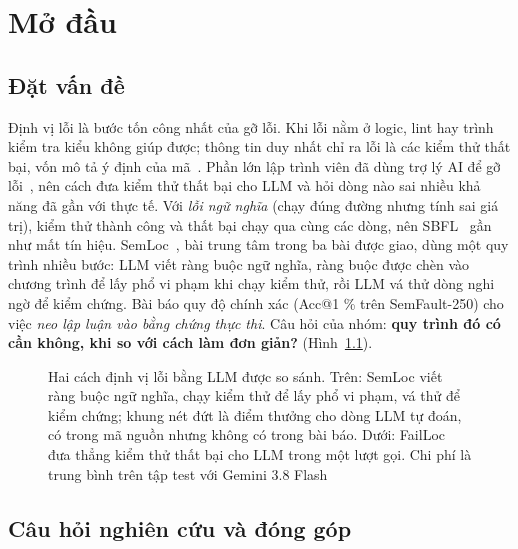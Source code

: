 \chapter{Mở đầu}
\label{chap:mo-dau}

\section{Đặt vấn đề}
\label{sec:dat-van-de}

Định vị lỗi là bước tốn công nhất của gỡ lỗi. Khi lỗi nằm ở logic, lint hay trình kiểm tra kiểu không giúp được;
thông tin duy nhất chỉ ra lỗi là các kiểm thử thất bại, vốn mô tả ý định của mã~\cite{beck2003tdd}. Phần lớn lập trình
viên đã dùng trợ lý AI để gỡ lỗi~\cite{stackoverflow2025,xiao2024devgpt}, nên cách đưa kiểm thử thất bại cho LLM và hỏi
dòng nào sai nhiều khả năng đã gần với thực tế. Với \emph{lỗi ngữ nghĩa} (chạy đúng đường nhưng tính sai giá trị), kiểm
thử thành công và thất bại chạy qua cùng các dòng, nên SBFL~\cite{jones2002,abreu2009} gần như mất tín hiệu.
SemLoc~\cite{yang2026semloc}, bài trung tâm trong ba bài được giao, dùng một quy trình nhiều bước: LLM viết ràng buộc ngữ
nghĩa, ràng buộc được chèn vào chương trình để lấy phổ vi phạm khi chạy kiểm thử, rồi LLM vá thử dòng nghi ngờ để kiểm
chứng. Bài báo quy độ chính xác (Acc@1 \RqOneSemlocClaudeTZeroEightAuthorAllAccOne\% trên SemFault-250) cho việc
\emph{neo lập luận vào bằng chứng thực thi}. Câu hỏi của nhóm: \textbf{quy trình đó có cần không, khi so với cách làm
đơn giản?} (Hình~\ref{fig:tong-quan}).

\begin{figure}[H]
\centering

\caption{Hai cách định vị lỗi bằng LLM được so sánh. Trên: SemLoc viết ràng buộc ngữ nghĩa, chạy kiểm thử để lấy phổ vi phạm, vá thử để kiểm chứng; khung nét đứt là điểm thưởng cho dòng LLM tự đoán, có trong mã nguồn nhưng không có trong bài báo. Dưới: FailLoc đưa thẳng kiểm thử thất bại cho LLM trong một lượt gọi. Chi phí là trung bình trên tập test với Gemini 3.8 Flash}
\label{fig:tong-quan}
\end{figure}

\section{Câu hỏi nghiên cứu và đóng góp}
\label{sec:cau-hoi}


